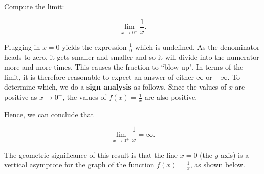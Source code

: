 \documentclass[handout]{ximera}
\begin{document}
\begin{example}[example 1]
Compute the limit: 

\[
\lim_{x \to 0^+} \frac{1}{x}.
\]

Plugging in $x=0$ yields the  expression $\frac{1}{0}$ which is undefined. 
As the denominator heads to zero, it gets smaller and smaller and so it will divide into the numerator 
more and more times.  This causes the fraction to ``blow up". In terms of the limit, it is therefore 
reasonable to expect an answer of either $\infty$ or $-\infty$.  
To determine which, we do a \textbf{sign analysis} as follows.
Since the values of $x$ are positive as $x \to 0^+$, the values of $f(x) = \frac{1}{x}$ are also positive.

Hence, we can conclude that 

\[\lim_{x \to 0^+} \frac{1}{x} =  \infty. \]

The geometric significance of this result is that the line $x=0$ (the $y$-axis) 
is a vertical asymptote for the graph of the function $f(x) = \frac{1}{x}$, as shown below.



\begin{center}
\end{center}
\end{example}
\end{document}
